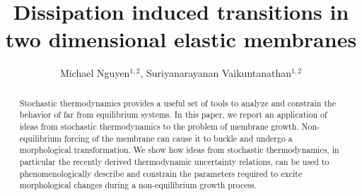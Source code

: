 \documentclass[amsmath,preprintnumbers,10pt,nofootinbib,prl,twocolumn]{revtex4-1}
\begin{document}
\title{Dissipation induced transitions in two dimensional elastic membranes}
\author{Michael Nguyen$^{1,2}$, Suriyanarayanan Vaikuntanathan$^{1,2}$} 
\begin{abstract}
Stochastic thermodynamics provides a useful set of tools to analyze and constrain the behavior of far from equilibrium systems. In this paper, we report an application of ideas from stochastic thermodynamics to the problem of membrane growth. Non-equilibrium forcing of the membrane can cause it to buckle and undergo a morphological transformation. We show how ideas from stochastic thermodynamics, in particular the recently derived thermodynamic uncertainty relations, can be used to phenomenologically describe and constrain the parameters required to excite morphological changes during a non-equilibrium growth process.

\end{abstract}
\maketitle 
\end{document}
